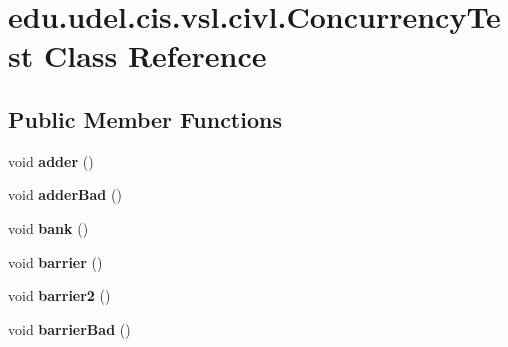 \hypertarget{classedu_1_1udel_1_1cis_1_1vsl_1_1civl_1_1ConcurrencyTest}{}\section{edu.\+udel.\+cis.\+vsl.\+civl.\+Concurrency\+Test Class Reference}
\label{classedu_1_1udel_1_1cis_1_1vsl_1_1civl_1_1ConcurrencyTest}
\subsection*{Public Member Functions}
\begin{DoxyCompactItemize}
\item 
\hypertarget{classedu_1_1udel_1_1cis_1_1vsl_1_1civl_1_1ConcurrencyTest_a1429dc1bd15dd1382e1e33a4d067592b}{}void {\bfseries adder} ()\label{classedu_1_1udel_1_1cis_1_1vsl_1_1civl_1_1ConcurrencyTest_a1429dc1bd15dd1382e1e33a4d067592b}

\item 
\hypertarget{classedu_1_1udel_1_1cis_1_1vsl_1_1civl_1_1ConcurrencyTest_aecae9ca658899c818bb8c60bae01bd48}{}void {\bfseries adder\+Bad} ()\label{classedu_1_1udel_1_1cis_1_1vsl_1_1civl_1_1ConcurrencyTest_aecae9ca658899c818bb8c60bae01bd48}

\item 
\hypertarget{classedu_1_1udel_1_1cis_1_1vsl_1_1civl_1_1ConcurrencyTest_aec13bed5bab6860bab382c43594d8735}{}void {\bfseries bank} ()\label{classedu_1_1udel_1_1cis_1_1vsl_1_1civl_1_1ConcurrencyTest_aec13bed5bab6860bab382c43594d8735}

\item 
\hypertarget{classedu_1_1udel_1_1cis_1_1vsl_1_1civl_1_1ConcurrencyTest_a17e25b51bece6bb0c5a6a8ba3edf97ac}{}void {\bfseries barrier} ()\label{classedu_1_1udel_1_1cis_1_1vsl_1_1civl_1_1ConcurrencyTest_a17e25b51bece6bb0c5a6a8ba3edf97ac}

\item 
\hypertarget{classedu_1_1udel_1_1cis_1_1vsl_1_1civl_1_1ConcurrencyTest_a074502d93bd48653543ceba2e392bda7}{}void {\bfseries barrier2} ()\label{classedu_1_1udel_1_1cis_1_1vsl_1_1civl_1_1ConcurrencyTest_a074502d93bd48653543ceba2e392bda7}

\item 
\hypertarget{classedu_1_1udel_1_1cis_1_1vsl_1_1civl_1_1ConcurrencyTest_aec164c5fb1360dbcb959db107acf4fcc}{}void {\bfseries barrier\+Bad} ()\label{classedu_1_1udel_1_1cis_1_1vsl_1_1civl_1_1ConcurrencyTest_aec164c5fb1360dbcb959db107acf4fcc}


\end{DoxyCompactItemize}
